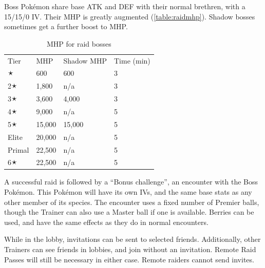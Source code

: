 Boss Pokémon share base ATK and DEF with their normal brethren, with a 15/15/0 IV\@.
Their MHP is greatly augmented (\autoref{table:raidmhp}).
Shadow bosses sometimes get a further boost to MHP\@.
\begin{table}
\centering
\begin{tabular}{llll}
  Tier & MHP & Shadow MHP & Time (min)\\
  \Midrule
  1🟉 & 600 & 600 & 3 \\
  2🟉 & 1,800 & n/a & 3\\
  3🟉 & 3,600 & 4,000 & 3\\
  4🟉 & 9,000 & n/a & 5\\
  5🟉 & 15,000 & 15,000 & 5\\
  Elite & 20,000 & n/a & 5\\
  Primal & 22,500 & n/a & 5\\
  6🟉 & 22,500 & n/a & 5\\
\end{tabular}
\caption{MHP for raid bosses\label{table:raidmhp}}
\end{table}
A successful raid is followed by a ``Bonus challenge'', an encounter with the Boss Pokémon.
This Pokémon will have its own IVs, and the same base stats as any other member of its species.
The encounter uses a fixed number of Premier balls, though the Trainer can also
  use a Master ball if one is available.
Berries can be used, and have the same effects as they do in normal encounters.

While in the lobby, invitations can be sent to selected friends.
Additionally, other Trainers can see friends in lobbies, and join without an invitation.
Remote Raid Passes will still be necessary in either case.
Remote raiders cannot send invites.

